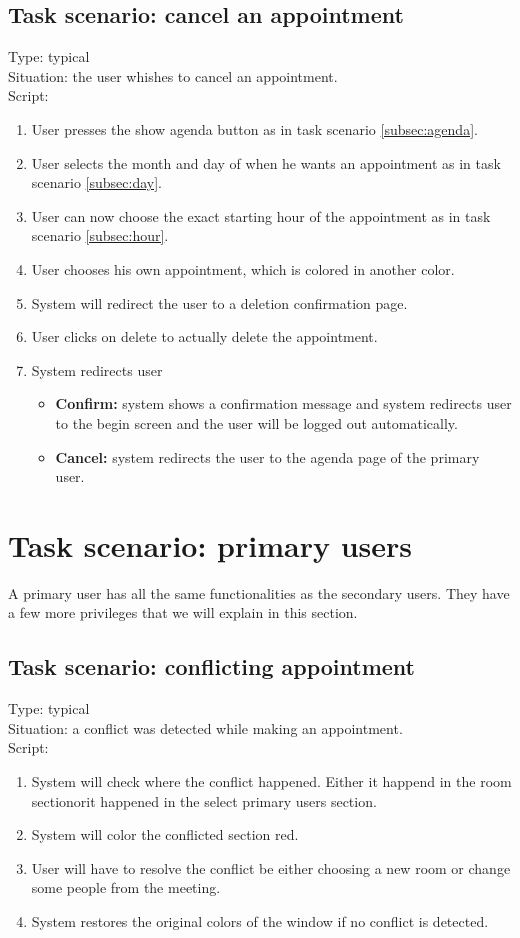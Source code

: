 \documentclass[11pt, a4paper,svglistings]{report}
\begin{document}
\subsection{Task scenario: cancel an appointment}


Type: typical \\
Situation: the user whishes to cancel an appointment. \\
Script:
\begin{enumerate}
\item User presses the show agenda button as in task scenario \ref{subsec:agenda}.
\item User selects the month and day of when he wants an appointment as in task scenario \ref{subsec:day}.
\item User can now choose the exact starting hour of the appointment as in task scenario \ref{subsec:hour}.
\item User chooses his own appointment, which is colored in another color.
\item System will redirect the user to a deletion confirmation page.
\item User clicks on delete to actually delete the appointment.
\item System redirects user
\begin{itemize}
\item \textbf{Confirm:} system shows a confirmation message and system redirects user to the begin screen and the user will be logged out automatically.
\item \textbf{Cancel:} system redirects the user to the agenda page of the primary user.
\end{itemize}
\end{enumerate}

\section{Task scenario: primary users}
A primary user has all the same functionalities as the secondary users. They have a few more privileges that we will explain in this section.


\subsection{Task scenario: conflicting appointment}


\label{subsec:conflictPrimary}Type: typical \\
Situation: a conflict was detected while making an appointment. \\
Script:
\begin{enumerate}
\item System will check where the conflict happened. Either it happend in the room sectionorit happened in the select primary users section.
\item System will color the conflicted section red.
\item User will have to resolve the conflict be either choosing a new room or change some people from the meeting.
\item System restores the original colors of the window if no conflict is detected.
\end{enumerate}
\end{document}
